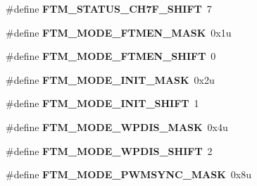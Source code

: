 \begin{DoxyCompactItemize}
\item 
\hypertarget{group___f_t_m___register___masks_ga04ac2f0031ce465f9d6c0b68cb9f0a76}{}\#define {\bfseries F\+T\+M\+\_\+\+S\+T\+A\+T\+U\+S\+\_\+\+C\+H7\+F\+\_\+\+S\+H\+I\+F\+T}~7\label{group___f_t_m___register___masks_ga04ac2f0031ce465f9d6c0b68cb9f0a76}

\item 
\hypertarget{group___f_t_m___register___masks_ga3142bc5c6261a7c04c95844ef35edd5b}{}\#define {\bfseries F\+T\+M\+\_\+\+M\+O\+D\+E\+\_\+\+F\+T\+M\+E\+N\+\_\+\+M\+A\+S\+K}~0x1u\label{group___f_t_m___register___masks_ga3142bc5c6261a7c04c95844ef35edd5b}

\item 
\hypertarget{group___f_t_m___register___masks_ga38df569e214287fa43254c2ddeafa5b5}{}\#define {\bfseries F\+T\+M\+\_\+\+M\+O\+D\+E\+\_\+\+F\+T\+M\+E\+N\+\_\+\+S\+H\+I\+F\+T}~0\label{group___f_t_m___register___masks_ga38df569e214287fa43254c2ddeafa5b5}

\item 
\hypertarget{group___f_t_m___register___masks_ga069f8d36fce3b99bf22cf8e588b855bf}{}\#define {\bfseries F\+T\+M\+\_\+\+M\+O\+D\+E\+\_\+\+I\+N\+I\+T\+\_\+\+M\+A\+S\+K}~0x2u\label{group___f_t_m___register___masks_ga069f8d36fce3b99bf22cf8e588b855bf}

\item 
\hypertarget{group___f_t_m___register___masks_ga0d0d007a2359f31a0cf50b06acef810c}{}\#define {\bfseries F\+T\+M\+\_\+\+M\+O\+D\+E\+\_\+\+I\+N\+I\+T\+\_\+\+S\+H\+I\+F\+T}~1\label{group___f_t_m___register___masks_ga0d0d007a2359f31a0cf50b06acef810c}

\item 
\hypertarget{group___f_t_m___register___masks_ga1178ceaccafa6eb9f10395901c75f7ba}{}\#define {\bfseries F\+T\+M\+\_\+\+M\+O\+D\+E\+\_\+\+W\+P\+D\+I\+S\+\_\+\+M\+A\+S\+K}~0x4u\label{group___f_t_m___register___masks_ga1178ceaccafa6eb9f10395901c75f7ba}

\item 
\hypertarget{group___f_t_m___register___masks_ga36fb0f391d4b52f38caf711ba8d73ae7}{}\#define {\bfseries F\+T\+M\+\_\+\+M\+O\+D\+E\+\_\+\+W\+P\+D\+I\+S\+\_\+\+S\+H\+I\+F\+T}~2\label{group___f_t_m___register___masks_ga36fb0f391d4b52f38caf711ba8d73ae7}

\item 
\hypertarget{group___f_t_m___register___masks_ga3993337287da1b6624d5f7d70f10b3d5}{}\#define {\bfseries F\+T\+M\+\_\+\+M\+O\+D\+E\+\_\+\+P\+W\+M\+S\+Y\+N\+C\+\_\+\+M\+A\+S\+K}~0x8u\label{group___f_t_m___register___masks_ga3993337287da1b6624d5f7d70f10b3d5}


\end{DoxyCompactItemize}
